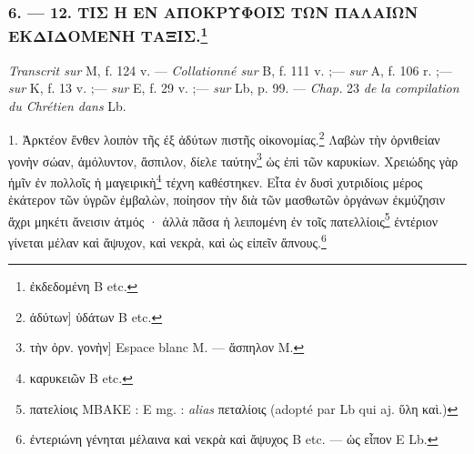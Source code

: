 \documentclass[a4paper, 11pt, oneside, polutonikogreek, french]{article}
\begin{document}
\subsubsection[6. --- 12. ΤΙΣ Η ΕΝ ΑΠΟΚΡΥΦΟΙΣ ΤΩΝ ΠΑΛΑΙΩΝ ΕΚΔΙΔΟΜΕΝΗ ΤΑΞΙΣ.]{6. --- 12. ΤΙΣ Η ΕΝ ΑΠΟΚΡΥΦΟΙΣ ΤΩΝ ΠΑΛΑΙΩΝ ΕΚΔΙΔΟΜΕΝΗ ΤΑΞΙΣ.\footnote{ἐκδεδομένη B etc.}}

\emph{Transcrit sur} M, f. 124 v. --- \emph{Collationné sur} B, f. 111 v. ;--- \emph{sur} A, f. 106 r. ;--- \emph{sur} K, f. 13 v. ;--- \emph{sur} E, f. 29 v. ;--- \emph{sur} Lb, p. 99. --- \emph{Chap.} 23 \emph{de la compilation du Chrétien dans} Lb.

\bigskip

1. Ἀρκτέον ἔνθεν λοιπὸν τῆς ἐξ ἀδύτων πιστῆς οἰκονομίας.\footnote{ἀδύτων] ὑδάτων B etc.} Λαβὼν τὴν ὀρνιθείαν γονὴν σώαν, ἀμόλυντον, ἄσπιλον, δίελε ταύτην\footnote{τὴν ὀρν. γονὴν] Espace blanc M. --- ἄσπηλον M.} ὡς ἐπὶ τῶν καρυκίων. Χρειώδης γὰρ ἡμῖν ἐν πολλοῖς ἡ μαγειρικὴ\footnote{καρυκειῶν B etc.} τέχνη καθέστηκεν. Εἶτα ἐν δυσὶ χυτριδίοις μέρος ἑκάτερον τῶν ὑγρῶν ἐμβαλὼν, ποίησον τὴν διὰ τῶν μασθωτῶν ὀργάνων ἐκμύζησιν ἄχρι μηκέτι ἄνεισιν ἀτμός · ἀλλὰ πᾶσα ἡ λειπομένη ἐν τοῖς πατελλίοις\footnote{πατελίοις MBAKE : E mg. : \emph{alias} πεταλίοις (adopté par Lb qui aj. ὕλη καὶ.)} ἐντέριον γίνεται μέλαν καὶ ἄψυχον, καὶ νεκρὰ, καὶ ὡς εἰπεῖν ἄπνους.\footnote{ἐντεριώνη γένηται μέλαινα καὶ νεκρὰ καὶ ἄψυχος B etc. --- ὡς εἶπον E Lb.}
\end{document}
